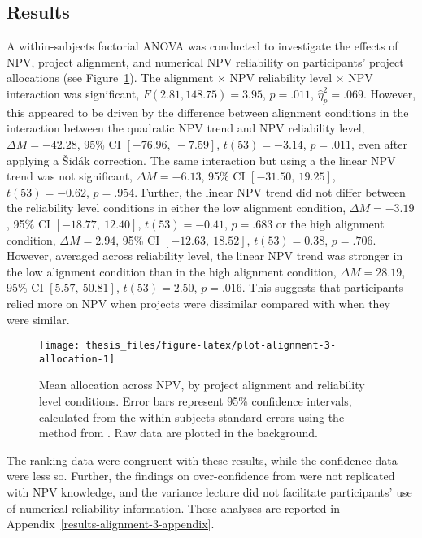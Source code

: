 \documentclass[a4paper, nobind]{templates/ociamthesis}
\theoremstyle{definition}
\theoremstyle{definition}
\theoremstyle{definition}
\theoremstyle{definition}
\theoremstyle{remark}
\begin{document}
\hypertarget{results-alignment-2}{%
\subsection{Results}\label{results-alignment-2}}

A within-subjects factorial ANOVA was conducted to investigate the effects of
NPV, project alignment, and numerical NPV reliability on participants' project
allocations (see Figure~\ref{fig:plot-alignment-3-allocation}). The alignment
\(\times\) NPV reliability level \(\times\) NPV interaction was significant,
\(F(2.81, 148.75) = 3.95\), \(p = .011\), \(\hat{\eta}^2_p = .069\).
However, this appeared to be driven by the difference between alignment
conditions in the interaction between the quadratic NPV trend and NPV
reliability level,
\(\Delta M = -42.28\), 95\% CI \([-76.96,~-7.59]\), \(t(53) = -3.14\), \(p = .011\), even after
applying a \v{S}idák correction. The same interaction but using a the linear NPV
trend was not significant,
\(\Delta M = -6.13\), 95\% CI \([-31.50,~19.25]\), \(t(53) = -0.62\), \(p = .954\). Further, the linear
NPV trend did not differ between the reliability level conditions in either the
low alignment condition, \(\Delta M = -3.19\), 95\% CI \([-18.77,~12.40]\), \(t(53) = -0.41\), \(p = .683\)
or the high alignment condition,
\(\Delta M = 2.94\), 95\% CI \([-12.63,~18.52]\), \(t(53) = 0.38\), \(p = .706\). However, averaged
across reliability level, the linear NPV trend was stronger in the low alignment
condition than in the high alignment condition,
\(\Delta M = 28.19\), 95\% CI \([5.57,~50.81]\), \(t(53) = 2.50\), \(p = .016\). This suggests that
participants relied more on NPV when projects were dissimilar compared with when
they were similar.



\begin{figure}
\texttt{[image: thesis\_files/figure-latex/plot-alignment-3-allocation-1]} \caption{Mean allocation across NPV, by project alignment and reliability level conditions. Error bars represent 95\% confidence intervals, calculated from the within-subjects standard errors using the method from \textcite{cousineau2014}. Raw data are plotted in the background.}\label{fig:plot-alignment-3-allocation}
\end{figure}

The ranking data were congruent with these results, while the confidence data
were less so. Further, the findings on over-confidence from \textcite[Study~1]{long2018}
were not replicated with NPV knowledge, and the variance lecture did not
facilitate participants' use of numerical reliability information. These
analyses are reported in Appendix~\ref{results-alignment-3-appendix}.
\end{document}
